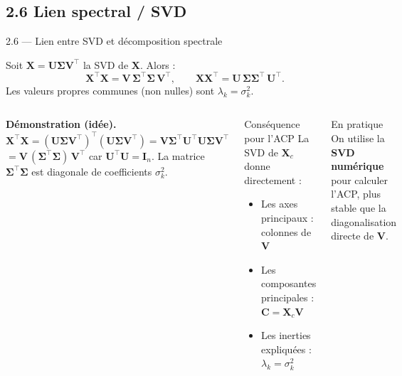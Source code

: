 \subsection{2.6 Lien spectral / SVD}
\begin{frame}{2.6 — Lien entre SVD et décomposition spectrale}
\begin{theorem}
Soit $\mathbf{X} = \mathbf{U}\mathbf{\Sigma}\mathbf{V}^\top$ la SVD de $\mathbf{X}$. Alors :
\[
\mathbf{X}^\top \mathbf{X} = \mathbf{V}\, \mathbf{\Sigma}^\top \mathbf{\Sigma}\, \mathbf{V}^\top,
\qquad
\mathbf{X} \mathbf{X}^\top = \mathbf{U}\, \mathbf{\Sigma} \mathbf{\Sigma}^\top\, \mathbf{U}^\top.
\]
Les valeurs propres communes (non nulles) sont $\lambda_k = \sigma_k^2$.
\end{theorem}

\begin{columns}[T]
\textbf{Démonstration (idée).}
\[
\mathbf{X}^\top \mathbf{X}
= (\mathbf{U}\mathbf{\Sigma}\mathbf{V}^\top)^\top (\mathbf{U}\mathbf{\Sigma}\mathbf{V}^\top)
= \mathbf{V}\mathbf{\Sigma}^\top \mathbf{U}^\top \mathbf{U} \mathbf{\Sigma}\mathbf{V}^\top
\]
$= \mathbf{V}\, (\mathbf{\Sigma}^\top \mathbf{\Sigma})\, \mathbf{V}^\top$
car $\mathbf{U}^\top \mathbf{U} = \mathbf{I}_n$. La matrice $\mathbf{\Sigma}^\top \mathbf{\Sigma}$
est diagonale de coefficients $\sigma_k^2$.

\begin{block}{Conséquence pour l'ACP}
\small La SVD de $\mathbf{X}_c$ donne directement :
\begin{itemize}\small
  \item Les axes principaux : colonnes de $\mathbf{V}$
  \item Les composantes principales : $\mathbf{C} = \mathbf{X}_c \mathbf{V}$
  \item Les inerties expliquées : $\lambda_k = \sigma_k^2$
\end{itemize}
\end{block}

\begin{alertblock}{En pratique}
\small On utilise la \textbf{SVD numérique} pour calculer l'ACP, plus stable
que la diagonalisation directe de $\mathbf{V}$.
\end{alertblock}
\end{columns}
\end{frame}

